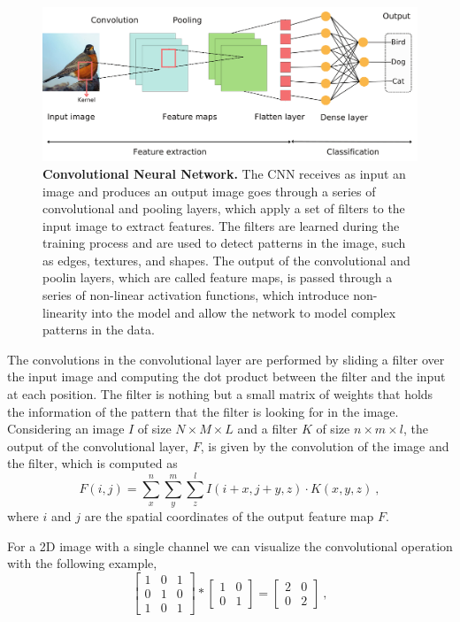 \begin{figure}[H]
  \centering
  \includegraphics[width=1\textwidth]{Figures/CNN.pdf}
  \caption[Convolutional Neural Network]{
    \textbf{Convolutional Neural Network.} The CNN receives as input an image
    and produces an output image goes through a series of convolutional and
    pooling layers, which apply a set of filters to the input image to extract
    features. The filters are learned during the training process and are used
    to detect patterns in the image, such as edges, textures, and shapes. The
    output of the convolutional and poolin layers, which are called feature
    maps, is passed through a series of non-linear activation functions, which
    introduce non-linearity into the model and allow the network to model
    complex patterns in the data.}
  \label{fig:CNN_scheme}
\end{figure}

The convolutions in the convolutional layer are performed by sliding a filter
over the input image and computing the dot product between the filter and the
input at each position. The filter is nothing but a small matrix of weights
that holds the information of the pattern that the filter is looking for in the
image. Considering an image $I$ of size $N \times M \times L$ and a filter $K$
of size $n \times m \times l$, the output of the convolutional layer, $F$, is
given by the convolution of the image and the filter, which is computed as
\begin{equation}
  F(i, j) = \sum_{x}^{n}\sum_{y}^{m}\sum_{z}^{l}I(i+x, j+y, z)\cdot K(x, y,
  z)
  \ ,
\end{equation}
where $i$ and $j$ are the spatial coordinates of the output feature map $F$.

For a 2D image with a single channel we can visualize the convolutional
operation with the following example,
\begin{equation}
  \begin{bmatrix}
    1 & 0 & 1 \\
    0 & 1 & 0 \\
    1 & 0 & 1
  \end{bmatrix}
  \ast
  \begin{bmatrix}
    1 & 0 \\
    0 & 1
  \end{bmatrix}
  =
  \begin{bmatrix}
    2 & 0 \\
    0 & 2
  \end{bmatrix}
  \ ,
\end{equation}

